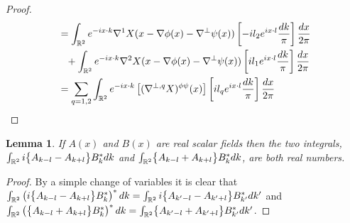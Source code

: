 \documentclass[noinfoline]{imsart}
\newtheorem{lemma}{Lemma}
\begin{document}
\begin{proof}
\begin{align}
 \nonumber &=  \int_{\Bbb R^2} e^{-ix \cdot k} \nabla^1 X(x-\nabla \phi(x)-\nabla^\perp\psi(x))\left[ -i  l_2 e^{i x \cdot l}\frac{dk}{\pi} \right]\frac{dx}{2\pi}\\
 &\phantom{=}  +\int_{\Bbb R^2} e^{-ix \cdot k} \nabla^2 X(x-\nabla \phi(x)-\nabla^\perp\psi(x))\left[  i  l_1 e^{i x \cdot l}\frac{dk}{\pi} \right]\frac{dx}{2\pi} \\
 \nonumber &= \sum_{q=1,2}  \int_{\Bbb R^2} e^{-ix \cdot k} \left[(\nabla^{\perp,q} X)^{\phi\psi}(x)\right]\left[  i  l_q e^{i x \cdot l} \frac{dk}{\pi}\right]\frac{dx}{2\pi}
\end{align}
\end{proof}





\begin{lemma}
\label{forreal}
If $A(x)$ and $B(x)$ are real scalar fields then  the two  integrals,  $\int_{\Bbb R^2} i\bigl\{ A_{k-l}  -   A_{k+l}  \bigr\} B^*_k dk$ and  $\int_{\Bbb R^2}\bigl\{  A_{k-l}  +    A_{k+l}   \bigr\} B^*_k dk$, are both real numbers.
\end{lemma}


\begin{proof}
By a simple change of variables it is clear that
$\int_{\Bbb R^2} \left(i\bigl\{ A_{k-l}  -   A_{k+l}  \bigr\} B^*_k\right)^* dk = \int_{\Bbb R^2} i\bigl\{ A_{k^\prime-l} - A_{k^\prime+l}  \bigr\} B_{k^\prime}^* dk^\prime$ and $\int_{\Bbb R^2} \left(\bigl\{  A_{k-l}  +    A_{k+l}   \bigr\} B^*_k \right)^* dk  = \int_{\Bbb R^2} \bigl\{ A_{k^\prime-l} + A_{k^\prime+l}  \bigr\} B_{k^\prime}^* dk^\prime$.


\end{proof}
\end{document}
